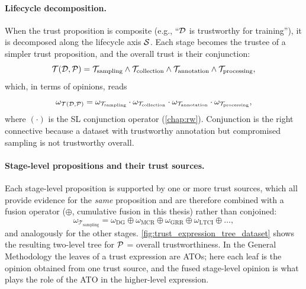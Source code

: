 \paragraph{Lifecycle decomposition.}
When the trust proposition is composite (e.g., ``$\mathcal{D}$ is trustworthy for training''), it is decomposed along the lifecycle axis $\mathcal{S}$. Each stage becomes the trustee of a simpler trust proposition, and the overall trust is their conjunction:
\begin{equation}
\mathcal{T}(\mathcal{D}, \mathcal{P})
= \mathcal{T}_{\text{sampling}} \wedge \mathcal{T}_{\text{collection}}
  \wedge \mathcal{T}_{\text{annotation}} \wedge \mathcal{T}_{\text{processing}},
\label{eq:dataset-trust:lifecycle-decomposition}
\end{equation}
which, in terms of opinions, reads
\[
\omega_{\mathcal{T}(\mathcal{D}, \mathcal{P})} = \omega_{\mathcal{T}_{\text{sampling}}} \cdot \omega_{\mathcal{T}_{\text{collection}}} \cdot \omega_{\mathcal{T}_{\text{annotation}} } \cdot \omega_{\mathcal{T}_{\text{processing}}},
\]
where $(\cdot)$ is the \ac{SL} conjunction operator (\cref{chap:rw}). Conjunction is the right connective because a dataset with trustworthy annotation but compromised sampling is not trustworthy overall.

\paragraph{Stage-level propositions and their trust sources.}
Each stage-level proposition is supported by one or more trust sources, which all provide evidence for the \emph{same} proposition and are therefore combined with a fusion operator ($\oplus$, cumulative fusion in this thesis) rather than conjoined:
\begin{equation}
\omega_{\mathcal{T}_{\text{sampling}}}
= \omega_{\text{DG}} \oplus \omega_{\text{MCR}} \oplus \omega_{\text{GRR}}
  \oplus \omega_{\text{LTCI}} \oplus \dots,
\label{eq:dataset-trust:metric-aggregation}
\end{equation}
and analogously for the other stages. \cref{fig:trust_expression_tree_dataset} shows the resulting two-level tree for $\mathcal{P}$ = overall trustworthiness. In the General Methodology the leaves of a trust expression are \acp{ATO}; here each leaf is the opinion obtained from one trust source, and the fused stage-level opinion is what plays the role of the \ac{ATO} in the higher-level expression.

